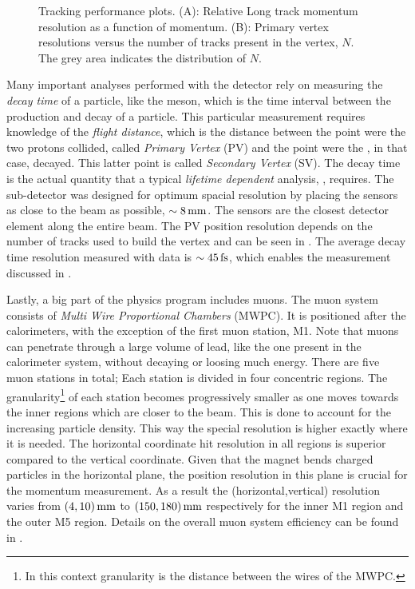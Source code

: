 \begin{figure}[t]
\begin{subfigure}{0.5\textwidth}
    \caption{}
    \label{det_velo_pv_res}
  \end{subfigure}
  \caption{Tracking performance plots. (A): Relative Long track momentum resolution as a function of momentum.
          (B): Primary vertex resolutions versus the number of tracks present in the vertex, $N$. The grey area
          indicates the distribution of $N$.}
  \label{det_velo_perf}
\end{figure}

Many important analyses performed with the \lhcb detector rely on measuring the {\it decay time} of a particle,
like the \Bs meson, which is the time interval between the production and decay of a particle.
This particular measurement requires knowledge of the {\it flight distance}, which is the
distance between the point were the two protons collided, called {\it Primary Vertex} (PV) and the point were the
\Bs, in that case, decayed. This latter point is called {\it Secondary Vertex} (SV). The decay time is the actual
quantity that a typical {\it lifetime dependent} analysis, \eg \BsJpsiPhi, requires.
The \velo sub-detector was designed for optimum spacial resolution by placing the \velo sensors as close to the beam
as possible, $\sim 8 \rm \,mm$. The \velo sensors are the closest detector element along the entire \lhc beam.
The PV position resolution depends on the number of tracks used to build the vertex and can
be seen in . The average decay time resolution measured with \BsJpsiPhi data is $\sim 45\rm \,fs$,
which enables the \phis measurement discussed in .

Lastly, a big part of the \lhcb physics program includes muons. The muon system consists of {\it Multi Wire Proportional Chambers}
(MWPC). It is positioned after the calorimeters, with the exception of the first muon station, M1.
Note that muons can penetrate through a large volume of lead, like the one present in the calorimeter system,
without decaying or loosing much energy. There are five muon stations in total; Each station is divided in four concentric
regions. The granularity\footnote{In this context granularity is the distance between the wires of the MWPC.}
of each station becomes progressively smaller as one moves towards the inner regions which are closer to the beam.
This is done to account for the increasing particle density. This way the special resolution is higher exactly where
it is needed. The horizontal coordinate hit resolution in all regions is superior compared to the vertical coordinate.
Given that the \lhcb magnet bends charged particles in the horizontal plane, the position resolution in this plane
is crucial for the momentum measurement. As a result the (horizontal,vertical) resolution varies from $(4,10)\rm \,mm$ to
$(150,180)\rm \,mm$ respectively for the inner M1 region and the outer M5 region. Details on the overall muon system
efficiency can be found in \cite{AlvesJr:1492807}.
